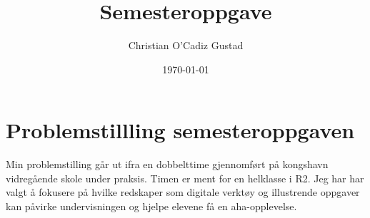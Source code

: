 \documentclass[11pt]{article}
\author{Christian O'Cadiz Gustad}
\date{\today}
\title{Semesteroppgave}
\begin{document}
\maketitle

\section*{Problemstillling semesteroppgaven}
\label{sec-1}
Min problemstilling går ut ifra en dobbelttime gjennomført på kongshavn vidregående skole under praksis.
Timen er ment for en helklasse i R2. Jeg har har valgt å fokusere på hvilke redskaper som 
digitale verktøy og illustrende oppgaver kan påvirke undervisningen og hjelpe elevene få en aha-opplevelse.   


\newpage
\end{document}
